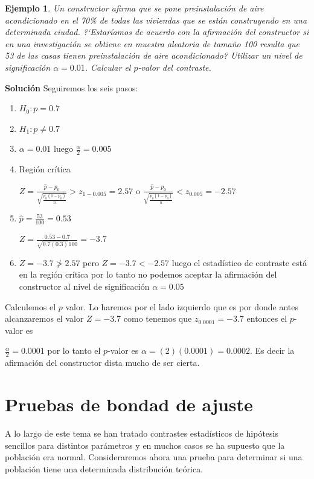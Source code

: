 \documentclass[12pt]{report}
\newtheorem{example}[definition]{Ejemplo}
\begin{document}
       \begin{example}
       Un constructor afirma que se pone preinstalación de aire
       acondicionado en el 70\% de  todas las viviendas que se
       están construyendo en una determinada ciudad. ?`Estaríamos de
       acuerdo con la afirmación del constructor si en una investigación
       se obtiene en muestra aleatoria de tamaño 100 resulta que 53 de
       las casas tienen preinstalación de aire acondicionado?
       Utilizar un nivel de significación $\alpha=0.01$. Calcular el
       $p$-valor del contraste.
       \end{example}
       \textbf{Solución}
       Seguiremos los seis pasos:
\begin{enumerate}[1)]
       \item $H_{0}:p=0.7$
       \item $H_{1}:p\not=0.7$
       \item $\alpha=0.01$ luego $\frac{\alpha}{2}=0.005$
       \item Región crítica

        $Z=
\frac{\hat{p}-p_{0}}{
    {\sqrt{\frac{p_{0}(1-p_{0})}{n}}}}>z_{1-0.005}=2.57$ o
        $\frac{\hat{p}-p_{0}}{
    {\sqrt{\frac{p_{0}(1-p_{0})}{n}}}}<z_{0.005}=-2.57$

    \item $\hat{p}=\frac{53}{100}=0.53$

    $Z=\frac{0.53-0.7}{{\sqrt{0.7 (0.3)}{100}}}=-3.7$

       \item $Z=-3.7\not>2.57$ pero $Z=-3.7<-2.57$ luego el estadístico
       de contraste está en la región crítica por lo tanto no podemos
       aceptar la afirmación del constructor al nivel de
       significación $\alpha=0.05$
\end{enumerate}


       Calculemos el $p$ valor. Lo haremos por el lado izquierdo que
       es por donde antes alcanzaremos el valor $Z=-3.7$ como tenemos
       que   $z_{0.0001}=-3.7$ entonces el $p$-valor es

       $\frac{\alpha}{2}=0.0001$ por lo tanto el $p$-valor es $\alpha=
       (2) (0.0001)=0.0002$. Es decir la afirmación del constructor
       dista mucho de ser cierta.

  \section{Pruebas de bondad de ajuste}
       A lo largo de este tema se han tratado contrastes estadísticos
       de hipótesis sencillos para distintos parámetros y en
       muchos casos se ha supuesto que la población era normal.
       Consideraremos ahora una prueba para determinar si una
       población tiene una determinada distribución teórica.
\end{document}
